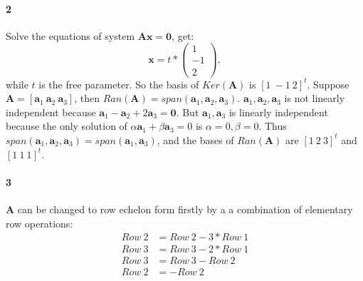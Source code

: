 \documentclass[22pt]{article}
\begin{document}
	\paragraph{2} Solve the equations of system $\mathbf{Ax} = \mathbf{0}$, get:
	\begin{equation}
		\mathbf{x} = t*\left( \begin{array}{c} 1 \\-1\\2
		\end{array}\right),
 	\end{equation}
 	while $t$ is the free parameter. So the basis of $Ker(\mathbf{A})$ is $[1\ -1\ 2]^t$.
 	Suppose $\mathbf{A} = [\mathbf{a}_1\ \mathbf{a}_2\ \mathbf{a}_3]$, then $Ran(\mathbf{A}) = span(\mathbf{a}_1,\mathbf{a}_2,\mathbf{a}_3)$. $\mathbf{a}_1,\mathbf{a}_2,\mathbf{a}_3$ is not linearly independent because $\mathbf{a}_1-\mathbf{a}_2+2\mathbf{a}_3 = \mathbf{0}$. But $\mathbf{a}_1,\mathbf{a}_3$ is linearly independent because the only solution of $\alpha\mathbf{a}_1+\beta\mathbf{a}_3=0$ is $\alpha = 0, \beta = 0$. Thus $span(\mathbf{a}_1,\mathbf{a}_2,\mathbf{a}_3)=  span(\mathbf{a}_1,\mathbf{a}_3)$, and the bases of $Ran(\mathbf{A})$ are $[1\ 2\ 3]^t$ and $[1\ 1\ 1]^t$.

 	\paragraph{3} $\mathbf{A}$ can be changed to row echelon form firstly by a a combination of elementary row operations:
 	\begin{align}
 		Row\ 2 &=  Row\ 2 - 3*Row\ 1\\
 		Row\ 3 &= Row\ 3 - 2*Row\ 1\\
 		Row\ 3 &= Row\ 3 - Row\ 2\\
 		Row\ 2 &= - Row\ 2
 	\end{align}
\end{document}
